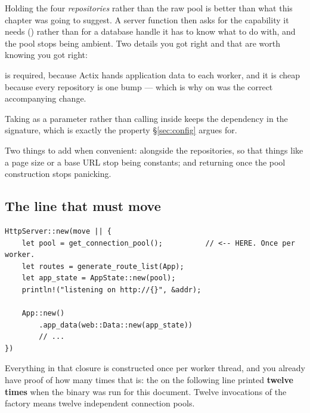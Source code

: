 \begin{pattern}
Holding the four \emph{repositories} rather than the raw pool is better than what this chapter was
going to suggest. A server function then asks for the capability it needs
() rather than for a database handle it has to know what to do
with, and the pool stops being ambient. Two details you got right and that are worth knowing you
got right:

 is required, because Actix hands application data to each worker, and it is cheap
because every repository is one  bump --- which is why  on
 was the correct accompanying change.

Taking  as a parameter rather than calling  inside
 keeps the dependency in the signature, which is exactly the property
\S\ref{sec:config} argues for.
\end{pattern}

Two things to add when convenient:  alongside the repositories, so that
things like a page size or a base URL stop being constants; and  returning
 once the pool construction stops panicking.

\subsection{The line that must move}

\begin{antipattern}
\begin{lstlisting}[style=rs,caption={\file{src/main.rs}, as written. The closure body runs
\emph{once per worker}.}]
HttpServer::new(move || {
    let pool = get_connection_pool();          // <-- HERE. Once per worker.
    let routes = generate_route_list(App);
    let app_state = AppState::new(pool);
    println!("listening on http://{}", &addr);

    App::new()
        .app_data(web::Data::new(app_state))
        // ...
})
\end{lstlisting}
\end{antipattern}

Everything in that closure is constructed once per worker thread, and you already have proof of how
many times that is: the  on the following line printed \textbf{twelve times} when the
binary was run for this document. Twelve invocations of the factory means twelve independent
connection pools.

